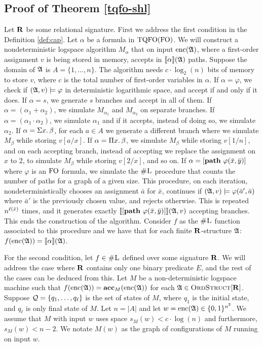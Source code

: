 \subsection*{Proof of Theorem \ref{tqfo-shl}}

Let $\mathbf{R}$ be some relational signature.  First we address the first condition in the Definition \ref{def:cap}. Let $\alpha$ be a formula in ${\rm TQFO}({\rm FO})$. We will construct a nondeterministic logspace algorithm $M_{\alpha}$ that on input ${\rm enc}(\mathfrak{A})$, where a first-order assignment $v$ is being stored in memory, accepts in ${\llbracket{}{\alpha}\rrbracket}(\mathfrak{A})$ paths. Suppose the domain of $\mathfrak{A}$ is $A = \{1,\ldots,n\}$. The algorithm needs $c\cdot\log_2(n)$ bits of memory to store $v$, where $c$ is the total number of first-order variables in $\alpha$. If $\alpha = \varphi$, we check if $(\mathfrak{A},v)\models\varphi$ in deterministic logarithmic space, and accept if and only if it does. If $\alpha = s$, we generate $s$ branches and accept in all of them. If $\alpha = (\alpha_1 + \alpha_2)$, we simulate $M_{\alpha_1}$ and $M_{\alpha_2}$ on separate branches. If $\alpha = (\alpha_1\cdot\alpha_2)$, we simulate $\alpha_1$ and if it accepts, instead of doing so, we simulate $\alpha_2$. If $\alpha = \Sigma{x}.\,\beta$, for each $a\in A$ we generate a different branch where we simulate $M_{\beta}$ while storing $v[a/x]$. If $\alpha = \Pi{x}.\,\beta$, we simulate $M_{\beta}$ while storing $v[1/n]$, and on each accepting branch, instead of accepting we replace the assignment on $x$ to 2, to simulate $M_{\beta}$ while storing $v[2/x]$, and so on. If $\alpha = [{\bf path} \,\, \varphi(\bar{x},\bar{y})]$ where $\varphi$ is an ${\rm FO}$ formula, we simulate the $\text{\sc \#L}$ procedure that counts the number of paths for a graph of a given size. This procedure, on each iteration, nondeterministically chooses an assignment $\bar{a}$ for $\bar{x}$, continues if $(\mathfrak{A},v)\models\varphi(\bar{a}',\bar{a})$ where $\bar{a}'$ is the previously chosen value, and rejects otherwise. This is repeated $n^{\ell(\bar{x})}$ times, and it generates exactly ${\llbracket{}{[{\bf path} \,\, \varphi(\bar{x},\bar{y})]}\rrbracket}(\mathfrak{A},v)$ accepting branches. This ends the construction of the algorithm. Consider $f$ as the $\text{\sc \#L}$ function associated to this procedure and we have that for each finite $\mathbf{R}$-structure $\mathfrak{A}$: $f({\rm enc}(\mathfrak{A})) = {\llbracket{}{\alpha}\rrbracket}(\mathfrak{A})$.

\vspace{1em}
For the second condition, let $f \in \text{\sc \#L}$ defined over some signature $\mathbf{R}$. We will address the case where $\mathbf{R}$ contains only one binary predicate $E$, and the rest of the cases can be deduced from this. Let $M$ be a non-deterministic logspace machine such that $f({\rm enc}(\mathfrak{A})) = \textbf{acc}_M({\rm enc}(\mathfrak{A}))$ for each $\mathfrak{A} \in \text{\sc OrdStruct}[\mathbf{R}]$. Suppose ${\cal Q} = \{q_1,\ldots,q_{\ell}\}$ is the set of states of $M$, where $q_1$ is the initial state, and $q_{\ell}$ is only final state of $M$. Let $n = \vert A \vert$ and let $w = {\rm enc}(\mathfrak{A}) \in \{0,1\}^{n^2}$. We assume that $M$ with input $w$ uses space $s_M(w) < c\cdot\log(n)$ and furthermore, $s_M(w) < n-2$. We notate $M(w)$ as the graph of configurations of $M$ running on input $w$.

